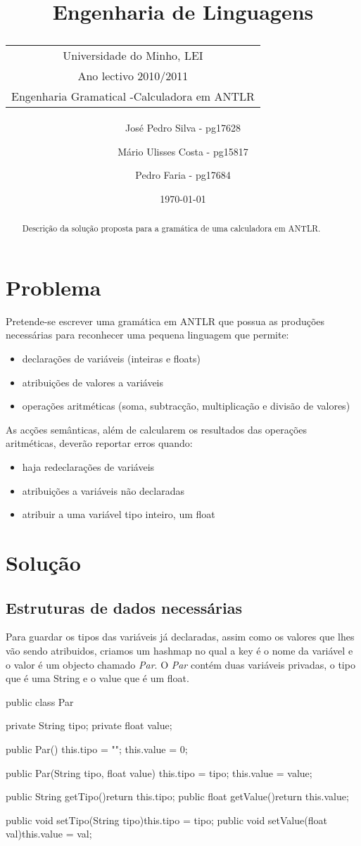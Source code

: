 \documentclass[11pt,a4paper]{article}
\title{\sf Engenharia de Linguagens \\
\begin{tabular}{c}
    {\small Universidade do Minho}, {\small LEI}\\
    {\small Ano lectivo 2010/2011}\\
    {\small Engenharia Gramatical -Calculadora em ANTLR}\\
\end{tabular}
}
\author{
    {\small José Pedro Silva - pg17628} \and
    {\small Mário Ulisses Costa - pg15817} \and
    {\small Pedro Faria - pg17684}}
\date{{\small \today}}
\begin{document}
\maketitle

\begin{abstract}

Descrição da solução proposta para a gramática de uma calculadora em ANTLR.
\end{abstract}

\tableofcontents

\section{Problema}
Pretende-se escrever uma gramática em ANTLR que possua as produções necessárias para reconhecer uma pequena linguagem que permite:
\begin{itemize}
    \item declarações de variáveis (inteiras e floats)
    \item atribuições de valores a variáveis
    \item operações aritméticas (soma, subtracção, multiplicação e divisão de valores)
\end{itemize}

As acções semânticas, além de calcularem os resultados das operações aritméticas, deverão reportar erros quando:
\begin{itemize}
    \item haja redeclarações de variáveis
    \item atribuições a variáveis não declaradas
    \item atribuir a uma variável tipo inteiro, um float
\end{itemize}


\section{Solução}

\subsection{Estruturas de dados necessárias}
Para guardar os tipos das variáveis já declaradas, assim como os valores que lhes vão sendo atribuidos, criamos um hashmap no qual a key é o nome da variável e o valor é um objecto chamado \textit{Par}.
O \textit{Par} contém duas variáveis privadas, o tipo que é uma String e o value que é um float.
\begin{code_txt}
public class Par{
	private String tipo;
	private float value;
	
	public Par(){
		this.tipo = "";
		this.value = 0;
	}
	
	public Par(String tipo, float value){
		this.tipo = tipo;
		this.value = value;
	}
	
	public String getTipo(){return this.tipo;}	
	public float getValue(){return this.value;}
	
	public void setTipo(String tipo){this.tipo = tipo;}	
	public void setValue(float val){this.value = val;}
}
\end{code_txt}
\end{document}

